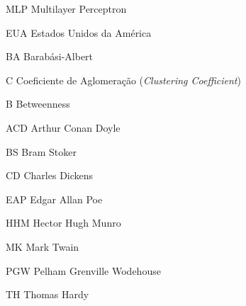 
\begin{siglas}
	\item[MLP] Multilayer Perceptron 
	\item[EUA] Estados Unidos da América
	\item[BA] Barabási-Albert
	\item[C] Coeficiente de Aglomeração (\emph{Clustering Coefficient})
	\item[B] Betweenness
	\item[ACD] Arthur Conan Doyle
	\item[BS] Bram Stoker
	\item[CD] Charles Dickens
	\item[EAP] Edgar Allan Poe
	\item[HHM] Hector Hugh Munro
	\item[MK] Mark Twain
	\item[PGW] Pelham Grenville Wodehouse
	\item[TH] Thomas Hardy
\end{siglas}
